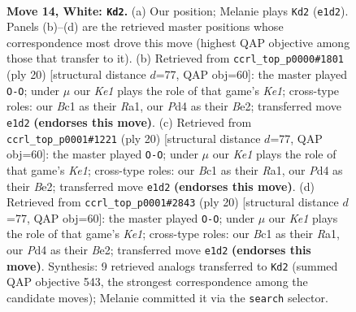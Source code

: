 \documentclass[11pt]{article}
\begin{document}
\clearpage

\begin{figure}[p]\centering
\begin{subfigure}{0.46\textwidth}\centering
\resizebox{\linewidth}{!}{%
\newchessgame
\chessboard[
  setfen={r1b2kr1/1p1qbp1p/p1n1p1p1/2Pp3n/3P4/1N6/PP2NPPP/1RBQKB1R w - - 4 14},
  showmover=false,
  pgfstyle=straightmove, color=movearrow, markmove={e1-d2}
]}
\caption{}
\end{subfigure}\hfill
\begin{subfigure}{0.46\textwidth}\centering
\resizebox{\linewidth}{!}{%
\newchessgame
\chessboard[
  setfen={r1bq1rk1/pp3pbp/3p1np1/2pP4/Pn2P3/2N5/1P1NBPPP/R1BQK2R w KQ - 1 11},
  showmover=false,
  pgfstyle=straightmove, color=movearrow, markmove={e1-g1}
]}
\caption{}
\end{subfigure}
\\[4pt]
\begin{subfigure}{0.46\textwidth}\centering
\resizebox{\linewidth}{!}{%
\newchessgame
\chessboard[
  setfen={r1bq1rk1/pp3pbp/3p1np1/2pP4/Pn2P3/2N5/1P1NBPPP/R1BQK2R w KQ - 1 11},
  showmover=false,
  pgfstyle=straightmove, color=movearrow, markmove={e1-g1}
]}
\caption{}
\end{subfigure}\hfill
\begin{subfigure}{0.46\textwidth}\centering
\resizebox{\linewidth}{!}{%
\newchessgame
\chessboard[
  setfen={r1bq1rk1/pp3pbp/3p1np1/2pP4/Pn2P3/2N5/1P1NBPPP/R1BQK2R w KQ - 1 11},
  showmover=false,
  pgfstyle=straightmove, color=movearrow, markmove={e1-g1}
]}
\caption{}
\end{subfigure}
\caption{\textbf{Move 14, White: \texttt{Kd2}.} (a) Our position; Melanie plays \texttt{Kd2} (\texttt{e1d2}). Panels (b)--(d) are the retrieved master positions whose correspondence most drove this move (highest QAP objective among those that transfer to it). (b) Retrieved from \texttt{ccrl\_top\_p0000\#1801} (ply 20) [structural distance $d$=77, QAP obj=60]: the master played \texttt{O-O}; under $\mu$ our \emph{Ke1} plays the role of that game's \emph{Ke1}; cross-type roles: our \emph{B}c1 as their \emph{R}a1, our \emph{P}d4 as their \emph{B}e2; transferred move \texttt{e1d2} \textbf{(endorses this move)}. (c) Retrieved from \texttt{ccrl\_top\_p0001\#1221} (ply 20) [structural distance $d$=77, QAP obj=60]: the master played \texttt{O-O}; under $\mu$ our \emph{Ke1} plays the role of that game's \emph{Ke1}; cross-type roles: our \emph{B}c1 as their \emph{R}a1, our \emph{P}d4 as their \emph{B}e2; transferred move \texttt{e1d2} \textbf{(endorses this move)}. (d) Retrieved from \texttt{ccrl\_top\_p0001\#2843} (ply 20) [structural distance $d$=77, QAP obj=60]: the master played \texttt{O-O}; under $\mu$ our \emph{Ke1} plays the role of that game's \emph{Ke1}; cross-type roles: our \emph{B}c1 as their \emph{R}a1, our \emph{P}d4 as their \emph{B}e2; transferred move \texttt{e1d2} \textbf{(endorses this move)}. Synthesis: 9 retrieved analogs transferred to \texttt{Kd2} (summed QAP objective 543, the strongest correspondence among the candidate moves); Melanie committed it via the \texttt{search} selector.}
\label{fig:thought-m26}
\end{figure}
\end{document}
